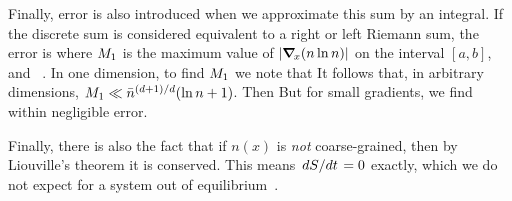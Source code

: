 {	Finally, error is also introduced when we approximate this sum by an integral.  If the discrete sum is considered equivalent to a right or left Riemann sum, the error is
	where $M_1$ is the maximum value of $\abs{\grad_{\!x} (n \ln n)}$ on the interval $[a, b]$, and ~\cite{Riemann}.  In one dimension, to find $M_1$ we note that
	It follows that, in arbitrary dimensions, $M_1 \ll \bar{n}^{(d + 1) / d} (\ln n + 1)$.  Then
	  But for small gradients, we find
	within negligible error.
	
	Finally, there is also the fact that if $n(x)$ is \emph{not} coarse-grained, then by Liouville's theorem it is conserved.  This means $\dv*{S}{t} = 0$ exactly, which we do not expect for a system out of equilibrium~\cite[pp.~61, 75]{Frigg}.
}

%
%


